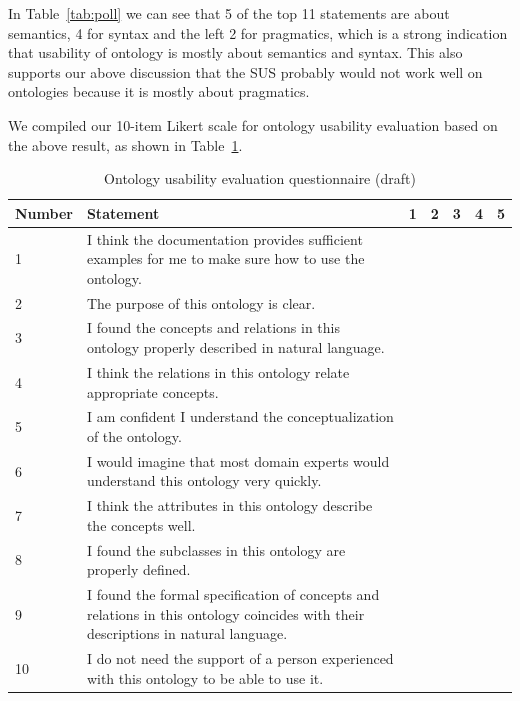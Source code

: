 In Table~\ref{tab:poll} we can see that 5 of the top 11 statements are about semantics, 4 for syntax and the left 2 for pragmatics, which is a strong indication that usability of ontology is mostly about semantics and syntax. This also supports our above discussion that the SUS probably would not work well on ontologies because it is mostly about pragmatics.

We compiled our 10-item Likert scale for ontology usability evaluation based on the above result, as shown in Table~\ref{tab:ous-draft}.
\begin{table}
	\begin{center}
		\caption{Ontology usability evaluation questionnaire (draft)}
		\label{tab:ous-draft}
		\begin{tabular}{|p{}|p{}|l|l|l|l|l|}
			\hline Number & Statement & 1 & 2 & 3 & 4 & 5 \\ 
			\hline 1 & I think the documentation provides sufficient examples for me to make sure how to use the ontology. &  &  &  &  &  \\ 
			\hline 2 & The purpose of this ontology is clear. &  &  &  &  &  \\ 
			\hline 3 & I found the concepts and relations in this ontology properly described in natural language. &  &  &  &  &  \\ 
			\hline 4 & I think the relations in this ontology relate appropriate concepts. &  &  &  &  &  \\ 
			\hline 5 & I am confident I understand the conceptualization of the ontology. &  &  &  &  &  \\ 
			\hline 6 & I would imagine that most domain experts would understand this ontology very quickly. &  &  &  &  &  \\ 
			\hline 7 & I think the attributes in this ontology describe the concepts well. &  &  &  &  &  \\ 
			\hline 8 & I found the subclasses in this ontology are properly defined. &  &  &  &  &  \\ 
			\hline 9 & I found the formal specification of concepts and relations in this ontology coincides with their descriptions in natural language. &  &  &  &  &  \\ 
			\hline 10 & I do not need the support of a person experienced with this ontology to be able to use it. &  &  &  &  &  \\ 
			\hline 
		\end{tabular} 
	\end{center}
\end{table}
